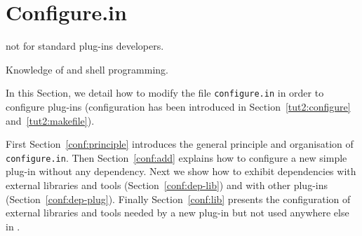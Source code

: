 





\section{\framac Configure.in}\label{adv:configure}

\begin{target}not for standard plug-ins developers.\end{target}

\begin{prereq}
  Knowledge of \autoconf and shell programming.
\end{prereq}

In this Section, we detail how to modify the file \texttt{configure.in} in
order to configure plug-ins (\framac configuration has been introduced in
Section~\ref{tut2:configure} and~\ref{tut2:makefile}).

First Section~\ref{conf:principle} introduces the general principle and
organisation of \texttt{configure.in}. Then Section~\ref{conf:add} explains how
to configure a new simple plug-in without any dependency. Next we show how to
exhibit dependencies with external libraries and tools
(Section~\ref{conf:dep-lib}) and with other plug-ins
(Section~\ref{conf:dep-plug}). Finally Section~\ref{conf:lib} presents the
configuration of external libraries and tools needed by a new plug-in but not
used anywhere else in \framac.

